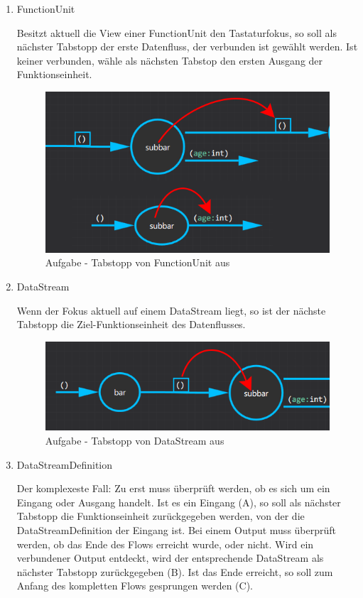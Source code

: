 \begin{enumerate}
	\item FunctionUnit

	Besitzt aktuell die View einer FunctionUnit den Tastaturfokus, so soll als
	nächster Tabstopp der erste Datenfluss, der verbunden ist gewählt werden. Ist keiner
	verbunden, wähle als nächsten Tabstop den ersten Ausgang der Funktionseinheit.
	
	\begin{figure}[H]
		\centering
		\includegraphics[width=0.6\linewidth]{./img/tabstop_functionunit.png}
		\caption{Aufgabe - Tabstopp von FunctionUnit aus}
	\end{figure}
	
	\item DataStream

	 Wenn der Fokus aktuell auf einem DataStream liegt, so ist der nächste Tabstopp die Ziel-Funktionseinheit des Datenflusses.

	\begin{figure}[H]
		\centering
		\includegraphics[width=0.6\linewidth]{./img/tabstop_datastream.png}
		\caption{Aufgabe - Tabstopp von DataStream aus}
	\end{figure}
	
	\item DataStreamDefinition

	Der komplexeste Fall: 
	Zu erst muss überprüft werden, ob es sich um ein Eingang oder Ausgang
	handelt. Ist es ein Eingang (A), so soll als nächster Tabstopp die Funktionseinheit
	zurückgegeben werden, von der die DataStreamDefinition der Eingang ist. 
	Bei einem Output muss überprüft werden, ob das Ende des Flows erreicht
	wurde, oder nicht. Wird ein verbundener Output entdeckt, wird der
	entsprechende DataStream als nächster Tabstopp zurückgegeben (B). Ist das Ende
	erreicht, so soll zum Anfang des kompletten Flows gesprungen werden (C).
	

\end{enumerate}
